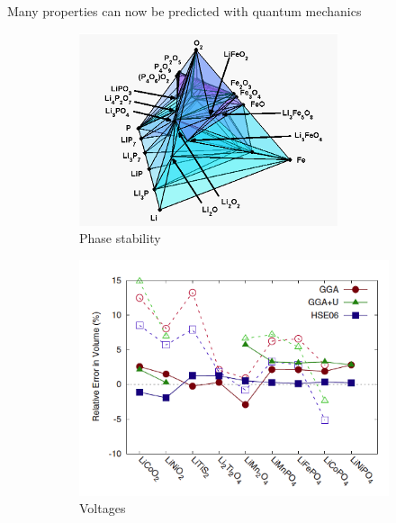 \documentclass[aspectratio=169]{beamer}
\begin{document}
\begin{frame}{Many properties can now be predicted with quantum mechanics}
\begin{figure}
    \centering
    \begin{subfigure}{0.2\textwidth}
        \includegraphics[width=\linewidth]{lectures/figures/1_phase_diagram.png}
    \caption{Phase stability\cite{ongLiFeO22008}}
    \end{subfigure}
    \begin{subfigure}{0.2\textwidth}
        \includegraphics[width=\linewidth]{lectures/figures/1_Voltage.png}
    \caption{Voltages\cite{chevrierHybridDensityFunctional2010}}
    \end{subfigure}
    \begin{subfigure}{0.2\textwidth}

\end{subfigure}
\end{figure}
\end{frame}
\end{document}
